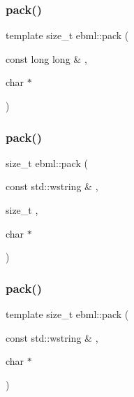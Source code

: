 \mbox{\label{namespaceebml_ac35ff5c48449c99a03dced64fdad8d9e}} 
\subsubsection{\texorpdfstring{pack()}{pack()}\hspace{0.1cm}{\footnotesize\ttfamily [6/18]}}
{\footnotesize\ttfamily template size\+\_\+t ebml\+::pack (\begin{DoxyParamCaption}\item[{const long long \&}]{,  }\item[{char $\ast$}]{ }\end{DoxyParamCaption})}

\mbox{\label{namespaceebml_afe17a10f5bbba38018c292f620088230}} 
\subsubsection{\texorpdfstring{pack()}{pack()}\hspace{0.1cm}{\footnotesize\ttfamily [7/18]}}
{\footnotesize\ttfamily size\+\_\+t ebml\+::pack (\begin{DoxyParamCaption}\item[{const std\+::wstring \&}]{,  }\item[{size\+\_\+t}]{,  }\item[{char $\ast$}]{ }\end{DoxyParamCaption})}

\mbox{\label{namespaceebml_ac0fc71c240d5809912675751dc1644bf}} 
\subsubsection{\texorpdfstring{pack()}{pack()}\hspace{0.1cm}{\footnotesize\ttfamily [8/18]}}
{\footnotesize\ttfamily template size\+\_\+t ebml\+::pack (\begin{DoxyParamCaption}\item[{const std\+::wstring \&}]{,  }\item[{char $\ast$}]{ }\end{DoxyParamCaption})}

